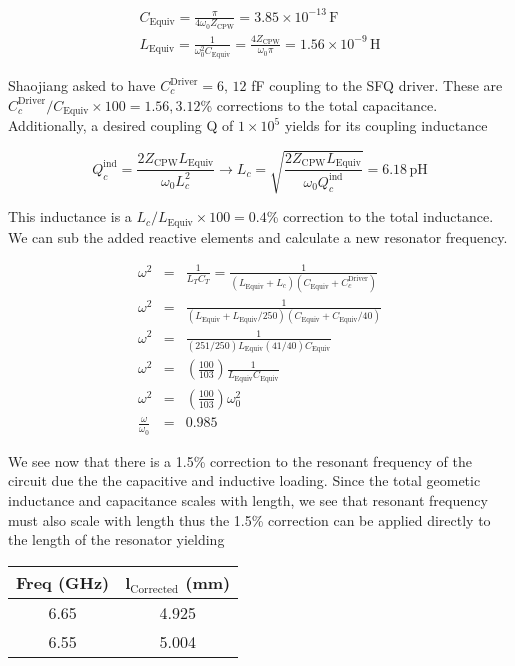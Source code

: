 \documentclass[12pt,reqno]{amsart}
\begin{document}
\begin{eqnarray}
C_\text{Equiv} = \frac{\pi}{4 \omega_0 Z_\text{CPW}} = 3.85\times 10^{-13}  \, \text{F}\\
L_\text{Equiv} = \frac{1}{\omega_0^2 C_\text{Equiv}} = \frac{4 Z_\text{CPW}}{\omega_0 \pi} = 1.56\times 10^{-9} \, \text{H}
\end{eqnarray}

Shaojiang asked to have $C_c^\text{Driver} = 6, \,12$ fF coupling to the SFQ driver. These are $C_c^\text{Driver}/C_\text{Equiv}\times 100 =  1.56, 3.12$\% corrections to the total capacitance. Additionally, a desired coupling Q of $1\times10^5$ yields for its coupling inductance

\begin{equation}
Q_c^\text{ind} = \frac{2Z_\text{CPW}L_\text{Equiv}}{\omega_0 L_c^2} \rightarrow L_c = \sqrt{\frac{2Z_\text{CPW}L_\text{Equiv}}{\omega_0 Q_c^\text{ind}}} = 6.18 \, \text{pH}
\end{equation}

This inductance is a $L_c/L_\text{Equiv} \times 100 = 0.4$\% correction to the total inductance. We can sub the added reactive elements and calculate a new resonator frequency.

\begin{eqnarray}
\omega^2 &= &\frac{1}{L_TC_T} = \frac{1}{(L_\text{Equiv} + L_c)(C_\text{Equiv} + C^\text{Driver}_c)} \\
\omega^2 &=& \frac{1}{(L_\text{Equiv} + L_\text{Equiv}/250)(C_\text{Equiv} + C_\text{Equiv}/40)} \\
\omega^2 &=& \frac{1}{(251/250)L_\text{Equiv}(41/40)C_\text{Equiv}} \\
\omega^2 &=& \left(\frac{100}{103}\right)\frac{1}{L_\text{Equiv}C_\text{Equiv}}\\
\omega^2 &=& \left(\frac{100}{103}\right) \omega_0^2 \\
\frac{\omega}{\omega_0} &=& 0.985
\end{eqnarray}
 
 We see now that there is a 1.5\% correction to the resonant frequency of the circuit due the the capacitive and inductive loading. Since the total geometic inductance  and capacitance scales with length, we see that resonant frequency must also scale with length thus the 1.5\% correction can be applied directly to the length of the resonator yielding
 
 \begin{table}[h]
\begin{center}
\begin{tabular}{|c|c|}
\textbf{Freq (GHz)} 	& \textbf{l$_\text{Corrected}$ (mm)}  \\
\hline
6.65			& 4.925 \\	
6.55			& 5.004 \\
\end{tabular}
\end{center}
\end{table}%
\end{document}
